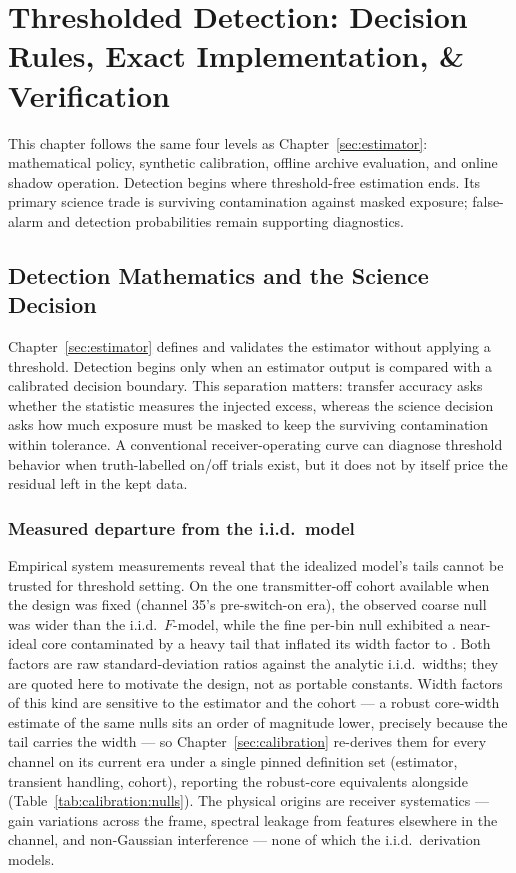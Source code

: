
\chapter{Thresholded Detection: Decision Rules, Exact Implementation, \& Verification}
\label{sec:detection}
\label{sec:impl}

This chapter follows the same four levels as Chapter~\ref{sec:estimator}: mathematical policy, synthetic calibration, offline archive evaluation, and online shadow operation. Detection begins where threshold-free estimation ends. Its primary science trade is surviving contamination against masked exposure; false-alarm and detection probabilities remain supporting diagnostics.

\section{Detection Mathematics and the Science Decision}
\label{sec:detection:rule}
\label{sec:pipeline:decision}

Chapter~\ref{sec:estimator} defines and validates the estimator without applying a threshold. Detection begins only when an estimator output is compared with a calibrated decision boundary. This separation matters: transfer accuracy asks whether the statistic measures the injected excess, whereas the science decision asks how much exposure must be masked to keep the surviving contamination within tolerance. A conventional receiver-operating curve can diagnose threshold behavior when truth-labelled on/off trials exist, but it does not by itself price the residual left in the kept data.

\subsection*{Measured departure from the i.i.d.\ model}

Empirical system measurements reveal that the idealized model's tails cannot be trusted for threshold setting. On the one transmitter-off cohort available when the design was fixed (channel 35's pre-switch-on era), the observed coarse null was \rerun{${\sim}19\times$} wider than the i.i.d.\ $F$-model, while the fine per-bin null exhibited a near-ideal core contaminated by a heavy  tail that inflated its width factor to \rerun{${\sim}13.8\times$}. Both factors are raw standard-deviation ratios against the analytic i.i.d.\ widths; they are quoted here to motivate the design, not as portable constants. Width factors of this kind are sensitive to the estimator and the cohort --- a robust core-width estimate of the same nulls sits an order of magnitude lower, precisely because the tail carries the width --- so Chapter~\ref{sec:calibration} re-derives them for every channel on its current era under a single pinned definition set (estimator, transient handling, cohort), reporting the robust-core equivalents alongside (Table~\ref{tab:calibration:nulls}). The physical origins are receiver systematics --- gain variations across the frame, spectral leakage from features elsewhere in the channel, and non-Gaussian interference --- none of which the i.i.d.\ derivation models.


